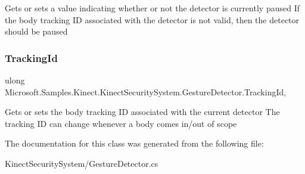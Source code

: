 Gets or sets a value indicating whether or not the detector is currently paused If the body tracking ID associated with the detector is not valid, then the detector should be paused 

\mbox{\label{class_microsoft_1_1_samples_1_1_kinect_1_1_kinect_security_system_1_1_gesture_detector_a4ea0f9304d3588e60a6d0e8a2832cb9c}} 
\subsubsection{\texorpdfstring{Tracking\+Id}{TrackingId}}
{\footnotesize\ttfamily ulong Microsoft.\+Samples.\+Kinect.\+Kinect\+Security\+System.\+Gesture\+Detector.\+Tracking\+Id\hspace{0.3cm}{\ttfamily [get]}, {\ttfamily [set]}}



Gets or sets the body tracking ID associated with the current detector The tracking ID can change whenever a body comes in/out of scope 



The documentation for this class was generated from the following file\+:\begin{DoxyCompactItemize}
\item 
Kinect\+Security\+System/Gesture\+Detector.\+cs\end{DoxyCompactItemize}
